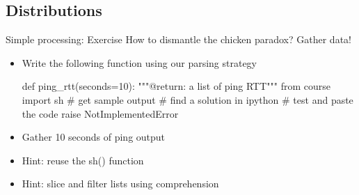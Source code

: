 \subsection{Distributions}
\begin{pyframe}{Simple processing: Exercise}
How to dismantle the chicken paradox? Gather data!
\begin{itemize}
\item Write the following function using our parsing strategy
\begin{pycode}
def ping_rtt(seconds=10):
    """@return: a list of ping RTT"""
    from course import sh
    # get sample output
    # find a solution in ipython
    # test and paste the code
    raise NotImplementedError
\end{pycode}
\item Gather 10 seconds of ping output
\item Hint: reuse the sh() function
\item Hint: slice and filter lists using comprehension
\end{itemize}
\end{pyframe}

